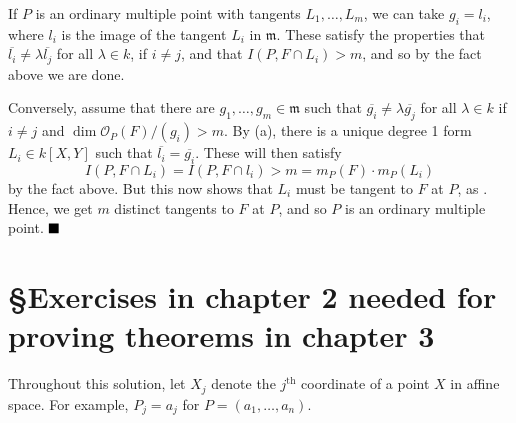 \documentclass[12pt]{article}
\begin{document}
\begin{enumerate}[label = (\alph*)]
          If \( P \) is an ordinary multiple point with tangents \( L_1, \dots, L_m \), we can take \( g_i = l_i \), where \( l_i \) is the image of the tangent \( L_i \) in \( \mathfrak{m} \). These satisfy the properties that \( \overline{l_i} \neq \lambda \overline{l_j} \) for all \( \lambda \in k \), if \( i \neq j \), and that \( I(P, F \cap L_i) > m \), and so by the fact above we are done.

          Conversely, assume that there are \( g_1, \dots, g_m \in \mathfrak{m} \) such that \( \overline{g_i} \neq \lambda \overline{g_j} \) for all \( \lambda \in k \) if \( i \neq j \) and \( \dim \mathscr{O}_P(F)/(g_i) > m \). By (a), there is a unique degree 1 form \( L_i \in k[X,Y] \) such that \( \overline{l_i} = \overline{g_i} \). These will then satisfy
          \[
              I(P, F \cap L_i) = I(P, F \cap l_i) > m = m_P(F)\cdot m_P(L_i)
          \] by the fact above. But this now shows that \( L_i \) must be tangent to \( F \) at \( P \), as . Hence, we get \( m \) distinct tangents to \( F \) at \( P \), and so \( P \) is an ordinary multiple point. \(\hfill \blacksquare\)
\end{enumerate}

\pagebreak

\section*{\S Exercises in chapter 2 needed for proving theorems in chapter 3}

\textcolor{maroon}{}Throughout this solution, let \( X_j \) denote the \( {j }^{\text{th}} \) coordinate of a point \( X \) in affine space. For example, \( P_j = a_j \) for \( P = (a_1, \dots, a_n) \).
\end{document}
